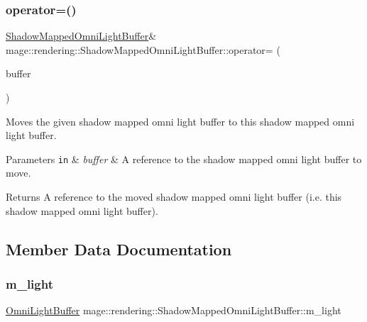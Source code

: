 \subsubsection{\texorpdfstring{operator=()}{operator=()}\hspace{0.1cm}{\footnotesize\ttfamily [2/2]}}
{\footnotesize\ttfamily \hyperlink{structmage_1_1rendering_1_1_shadow_mapped_omni_light_buffer}{Shadow\+Mapped\+Omni\+Light\+Buffer}\& mage\+::rendering\+::\+Shadow\+Mapped\+Omni\+Light\+Buffer\+::operator= (\begin{DoxyParamCaption}\item[{\hyperlink{structmage_1_1rendering_1_1_shadow_mapped_omni_light_buffer}{Shadow\+Mapped\+Omni\+Light\+Buffer} \&\&}]{buffer }\end{DoxyParamCaption})\hspace{0.3cm}{\ttfamily [default]}}

Moves the given shadow mapped omni light buffer to this shadow mapped omni light buffer.


\begin{DoxyParams}[1]{Parameters}
\mbox{\tt in}  & {\em buffer} & A reference to the shadow mapped omni light buffer to move. \\
\hline
\end{DoxyParams}
\begin{DoxyReturn}{Returns}
A reference to the moved shadow mapped omni light buffer (i.\+e. this shadow mapped omni light buffer). 
\end{DoxyReturn}


\subsection{Member Data Documentation}
\hypertarget{structmage_1_1rendering_1_1_shadow_mapped_omni_light_buffer_a6b316ed6c8b69d5aeb15fbe93c23de95}{}\label{structmage_1_1rendering_1_1_shadow_mapped_omni_light_buffer_a6b316ed6c8b69d5aeb15fbe93c23de95} 
\subsubsection{\texorpdfstring{m\+\_\+light}{m\_light}}
{\footnotesize\ttfamily \hyperlink{structmage_1_1rendering_1_1_omni_light_buffer}{Omni\+Light\+Buffer} mage\+::rendering\+::\+Shadow\+Mapped\+Omni\+Light\+Buffer\+::m\+\_\+light}

